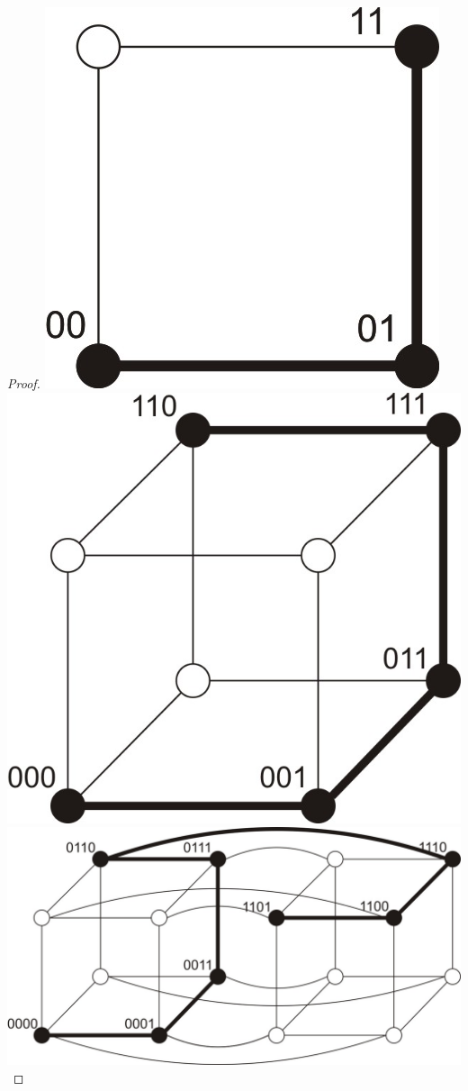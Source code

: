 \documentclass{pracamgr}
\begin{document}
\begin{proof}
     \hspace*{12pt}\includegraphics[scale=0.6]{img/Q2_long_path.jpg}
     \hspace*{12pt}\includegraphics[scale=0.6]{img/Q3_long_path.jpg}
     \hspace*{12pt}\includegraphics[scale=0.6]{img/Q4_long_path.jpg}\newline

\end{proof}
\end{document}
